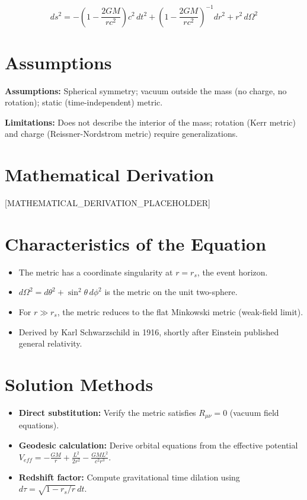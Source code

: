 \documentclass[11pt,openright]{book}
\begin{document}
\begin{equation}
ds^2 = -\left(1 - \frac{2GM}{rc^2}\right)c^2\,dt^2 + \left(1 - \frac{2GM}{rc^2}\right)^{-1}dr^2 + r^2\,d\Omega^2
\end{equation}
\section*{Assumptions}

\textbf{Assumptions:} Spherical symmetry; vacuum outside the mass (no charge, no rotation); static (time-independent) metric.


\textbf{Limitations:} Does not describe the interior of the mass; rotation (Kerr metric) and charge (Reissner-Nordstrom metric) require generalizations.


\section*{Mathematical Derivation}

[MATHEMATICAL_DERIVATION_PLACEHOLDER]

\section*{Characteristics of the Equation}

\begin{itemize}
    \item The metric has a coordinate singularity at $r = r_s$, the event horizon.
    \item $d\Omega^2 = d\theta^2 + \sin^2\theta\,d\phi^2$ is the metric on the unit two-sphere.
    \item For $r \gg r_s$, the metric reduces to the flat Minkowski metric (weak-field limit).
    \item Derived by Karl Schwarzschild in 1916, shortly after Einstein published general relativity.
\end{itemize}
\section*{Solution Methods}

\begin{itemize}
    \item \textbf{Direct substitution:} Verify the metric satisfies $R_{\mu\nu} = 0$ (vacuum field equations).
    \item \textbf{Geodesic calculation:} Derive orbital equations from the effective potential $V_{eff} = -\frac{GM}{r} + \frac{L^2}{2r^2} - \frac{GML^2}{c^2r^3}$.
    \item \textbf{Redshift factor:} Compute gravitational time dilation using $d\tau = \sqrt{1 - r_s/r}\,dt$.
\end{itemize}
\end{document}
